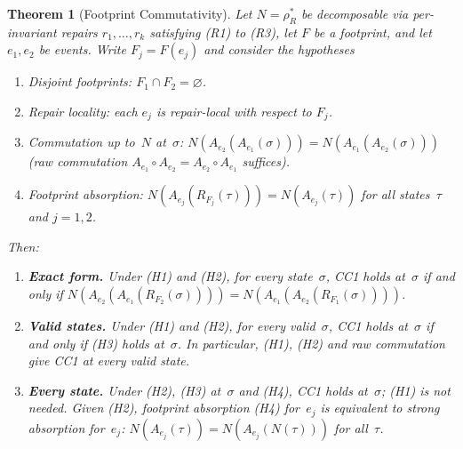 \documentclass[11pt,a4paper]{article}
\theoremstyle{plain}
\newtheorem{theorem}{Theorem}[section]
\theoremstyle{definition}
\theoremstyle{remark}
\begin{document}
\begin{theorem}[Footprint Commutativity]
\label{thm:footprint-cc1}
Let $N = \rho_R^*$ be decomposable via per-invariant repairs
$r_1, \ldots, r_k$ satisfying (R1) to (R3), let $F$ be a footprint, and let
$e_1, e_2$ be events.  Write $F_j = F(e_j)$ and consider the hypotheses
\begin{enumerate}[leftmargin=*,nosep,label=(H\arabic*)]
\item Disjoint footprints: $F_1 \cap F_2 = \varnothing$.
\item Repair locality: each $e_j$ is repair-local with respect to $F_j$.
\item Commutation up to~$N$ at~$\sigma$:
  $N(A_{e_2}(A_{e_1}(\sigma))) = N(A_{e_1}(A_{e_2}(\sigma)))$ (raw
  commutation $A_{e_1} \circ A_{e_2} = A_{e_2} \circ A_{e_1}$ suffices).
\item Footprint absorption: $N(A_{e_j}(R_{F_j}(\tau))) = N(A_{e_j}(\tau))$
  for all states~$\tau$ and $j = 1, 2$.
\end{enumerate}
Then:
\begin{enumerate}[leftmargin=*,nosep,label=(\alph*)]
\item \textbf{Exact form.}  Under (H1) and (H2), for every state~$\sigma$,
  CC1 holds at~$\sigma$ if and only if
  $N(A_{e_2}(A_{e_1}(R_{F_2}(\sigma)))) = N(A_{e_1}(A_{e_2}(R_{F_1}(\sigma))))$.
\item \textbf{Valid states.}  Under (H1) and (H2), for every valid~$\sigma$,
  CC1 holds at~$\sigma$ if and only if (H3) holds at~$\sigma$.  In
  particular, (H1), (H2) and raw commutation give CC1 at every valid state.
\item \textbf{Every state.}  Under (H2), (H3) at~$\sigma$ and (H4), CC1 holds
  at~$\sigma$; (H1) is not needed.  Given (H2), footprint absorption (H4)
  for~$e_j$ is equivalent to strong absorption for~$e_j$:
  $N(A_{e_j}(\tau)) = N(A_{e_j}(N(\tau)))$ for all~$\tau$.
\end{enumerate}
\end{theorem}
\end{document}
